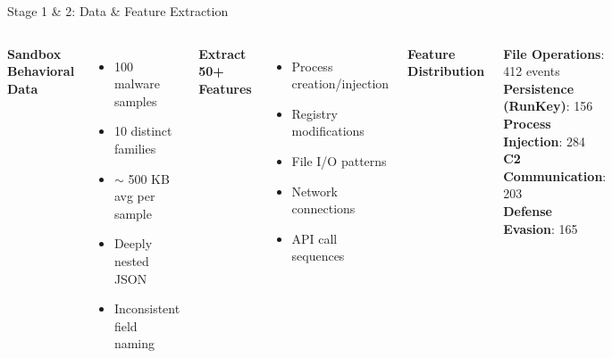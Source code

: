\documentclass[11pt,aspectratio=16:9]{beamer}
\begin{document}
\begin{frame}{Stage 1 \& 2: Data \& Feature Extraction}
  \vspace{0.3cm}
  \begin{columns}[T]
    \textbf{\textcolor{accent1}{Sandbox Behavioral Data}}\\[0.2cm]
    {\small
    \begin{itemize}
      \item 100 malware samples
      \item 10 distinct families
      \item $\sim$ 500 KB avg per sample
      \item Deeply nested JSON
      \item Inconsistent field naming
    \end{itemize}
    }
    
    \vspace{0.4cm}
    \textbf{\textcolor{accent1}{Extract 50+ Features}}\\[0.2cm]
    {\small
    \begin{itemize}
      \item Process creation/injection
      \item Registry modifications
      \item File I/O patterns
      \item Network connections
      \item API call sequences
    \end{itemize}
    }
    
    \textbf{\textcolor{accent2}{Feature Distribution}}\\[0.3cm]
    {\small
    \begin{tcolorbox}[colback=lightgray!50]
      \textbf{File Operations}: 412 events\\
      \textbf{Persistence (RunKey)}: 156\\
      \textbf{Process Injection}: 284\\
      \textbf{C2 Communication}: 203\\
      \textbf{Defense Evasion}: 165
    \end{tcolorbox}
    }
  \end{columns}
\end{frame}
\end{document}
